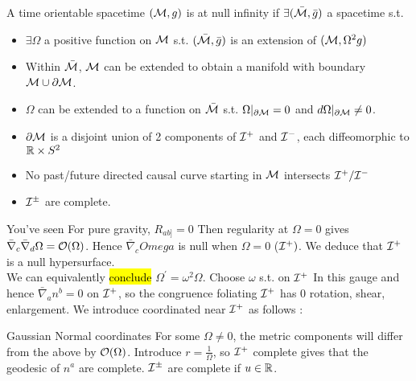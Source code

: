 \documentclass{article}
\begin{document}
\begin{definition}
A time orientable spacetime $(\mathcal{M},g)$ is  at null infinity if $\exists (\bar{\mathcal{M}},\bar{g})$ a spacetime s.t. 
\begin{itemize}
    \item $\exists \Omega$ a positive function on $\mathcal{M}$ s.t. $(\bar{\mathcal{M}},\bar{g})$ is an extension of $(\mathcal{M},\Omega^2 g)$
    \item Within $\bar{\mathcal{M}}$, $\mathcal{M}$ can be extended to obtain a manifold with boundary $\mathcal{M} \cup \partial \mathcal{M}$. 
    \item $\Omega$ can be extended to a function on $\bar{\mathcal{M}}$ s.t. $\Omega|_{\partial \mathcal{M}}=0$ and $d\Omega|_{\partial \mathcal{M}} \neq 0$.
    \item $\partial\mathcal{M}$ is a disjoint union of 2 components of $\mathcal{I}^+$ and $\mathcal{I}^-$, each diffeomorphic to $\mathbb{R}\times S^2$
    \item No past/future directed causal curve starting in $\mathcal{M}$ intersects $\mathcal{I}^+ / \mathcal{I}^-$ 
    \item $\mathcal{I}^\pm$ are complete. 
\end{itemize}
\end{definition}

You've seen 
For pure gravity, $R_{ab]}=0$
Then regularity at $\Omega=0$ gives $\bar{\nabla}_c \bar{\nabla}_d \Omega = \mathcal{O}(\Omega)$. Hence $\bar{\nabla}_c
Omega $ is null when $\Omega = 0$ ($\mathcal{I}^+)$. We deduce that $\mathcal{I}^+$ is a null hypersurface. \\
We can equivalently \hl{conclude}  $\Omega^\prime = \omega^2 \Omega$. Choose $\omega$ s.t. 
on $\mathcal{I}^+$
In this gauge 
and hence $\bar{\nabla}_a n^b = 0$ on $\mathcal{I}^+$, so the congruence foliating $\mathcal{I}^+$ has 0 rotation, shear, enlargement. We introduce coordinated near $\mathcal{I}^+$ as follows : 

Gaussian Normal coordinates 
For some $\Omega \neq 0$, the metric components will differ from the above by $\mathcal{O}(\Omega)$. Introduce $r= \frac{1}{\Omega}$, so 
$\mathcal{I}^+$ complete gives that the geodesic of $n^a$ are complete. $\mathcal{I}^\pm$ are complete if $u \in\mathbb{R}$. 
\end{document}
